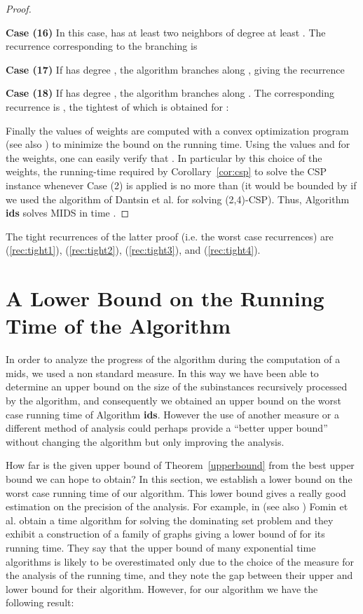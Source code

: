 \documentclass[a4paper,10pt]{article}
\theoremstyle{plain}
\theoremstyle{definition}
\theoremstyle{remark}
\newcommand{\MIDSpb}{\textsc{MIDS}\xspace}
\newcommand{\mids}{mids\xspace}
\newcommand{\CSPpb}{\textsc{CSP}\xspace}
\begin{document}
\begin{proof}
\begin{enumerate}
\end{enumerate}

{\bf Case (16)}
In this case,  has at least two neighbors of degree at least . The recurrence corresponding to the branching  is


{\bf Case (17)}
If  has degree , the algorithm branches along , giving the recurrence


{\bf Case (18)}
If  has degree , the algorithm branches along . The corresponding recurrence is , the tightest of which is
obtained for :


Finally the values of weights are computed with a convex optimization program \cite{GaspersS09} (see also \cite{Gaspers08})
to minimize the bound on the running time.
Using the values  and  for the weights, one can
easily verify that . In particular by this choice of the weights, the running-time required
by Corollary~\ref{cor:csp} to solve the \CSPpb instance whenever Case (2) is applied is no more than 
(it would be bounded by  if we used the algorithm of Dantsin et al. \cite{Dantsin} for solving (2,4)-\CSPpb).
Thus, Algorithm \textbf{ids} solves \MIDSpb in time .
\end{proof}

The tight recurrences of the latter proof (i.e. the worst case
recurrences) are (\ref{rec:tight1}), (\ref{rec:tight2}), (\ref{rec:tight3}), and (\ref{rec:tight4}).



\section{A Lower Bound on the Running Time of the Algorithm}
In order to analyze the progress of the algorithm during the computation of a
\mids, we used a non standard measure. In this way we have been able to
determine an upper bound on the size of the subinstances recursively processed by the
algorithm, and consequently we obtained an upper bound on the
worst case running time of Algorithm \textbf{ids}. However the use of another measure
or a different method of analysis could perhaps provide a
``better upper bound'' without changing the algorithm but only improving the
analysis.

How far is the given upper bound of Theorem~\ref{upperbound} from the best upper
bound we can hope to obtain?
In this section, we establish a lower bound on the worst case running time of
our algorithm. This lower bound gives a really good estimation on the precision of
the analysis. For example, in \cite{icalp2005} (see also \cite{AcmFGK}) Fomin et al. obtain a
 time algorithm for solving the dominating set problem and
they exhibit a construction of a family of graphs giving a lower bound of 
for its running time. They say that the upper bound of many exponential time
algorithms is likely to be overestimated only due to the choice of the measure
for the analysis of the running time, and they note the gap between their upper
and lower bound for their algorithm.
However, for our algorithm we have the following result:
\end{document}
